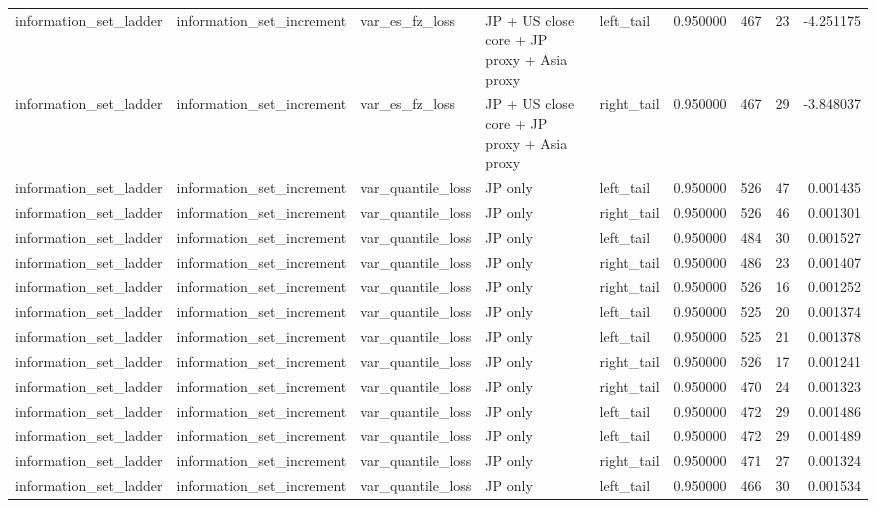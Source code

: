 \begin{tabular}{lllllrrrr}
information\_set\_ladder & information\_set\_increment & var\_es\_fz\_loss & JP + US close core + JP proxy + Asia proxy & left\_tail & 0.950000 & 467 & 23 & -4.251175 \\
information\_set\_ladder & information\_set\_increment & var\_es\_fz\_loss & JP + US close core + JP proxy + Asia proxy & right\_tail & 0.950000 & 467 & 29 & -3.848037 \\
information\_set\_ladder & information\_set\_increment & var\_quantile\_loss & JP only & left\_tail & 0.950000 & 526 & 47 & 0.001435 \\
information\_set\_ladder & information\_set\_increment & var\_quantile\_loss & JP only & right\_tail & 0.950000 & 526 & 46 & 0.001301 \\
information\_set\_ladder & information\_set\_increment & var\_quantile\_loss & JP only & left\_tail & 0.950000 & 484 & 30 & 0.001527 \\
information\_set\_ladder & information\_set\_increment & var\_quantile\_loss & JP only & right\_tail & 0.950000 & 486 & 23 & 0.001407 \\
information\_set\_ladder & information\_set\_increment & var\_quantile\_loss & JP only & right\_tail & 0.950000 & 526 & 16 & 0.001252 \\
information\_set\_ladder & information\_set\_increment & var\_quantile\_loss & JP only & left\_tail & 0.950000 & 525 & 20 & 0.001374 \\
information\_set\_ladder & information\_set\_increment & var\_quantile\_loss & JP only & left\_tail & 0.950000 & 525 & 21 & 0.001378 \\
information\_set\_ladder & information\_set\_increment & var\_quantile\_loss & JP only & right\_tail & 0.950000 & 526 & 17 & 0.001241 \\
information\_set\_ladder & information\_set\_increment & var\_quantile\_loss & JP only & right\_tail & 0.950000 & 470 & 24 & 0.001323 \\
information\_set\_ladder & information\_set\_increment & var\_quantile\_loss & JP only & left\_tail & 0.950000 & 472 & 29 & 0.001486 \\
information\_set\_ladder & information\_set\_increment & var\_quantile\_loss & JP only & left\_tail & 0.950000 & 472 & 29 & 0.001489 \\
information\_set\_ladder & information\_set\_increment & var\_quantile\_loss & JP only & right\_tail & 0.950000 & 471 & 27 & 0.001324 \\
information\_set\_ladder & information\_set\_increment & var\_quantile\_loss & JP only & left\_tail & 0.950000 & 466 & 30 & 0.001534 \\

\end{tabular}

